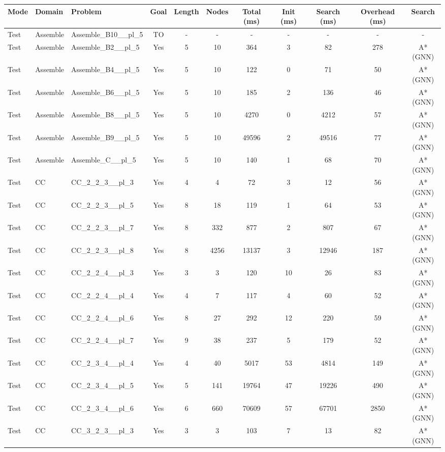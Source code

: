 \documentclass{article}
\begin{document}
\begin{tabular}{lllcccccccc}
\toprule
Mode & Domain & Problem & Goal & Length & Nodes & Total (ms) & Init (ms) & Search (ms) & Overhead (ms) & Search \\
\midrule
Test & Assemble & Assemble\_B10\_\_pl\_5 & TO & - & - & - & - & - & - & - \\
Test & Assemble & Assemble\_B2\_\_pl\_5 & Yes & 5 & 10 & 364 & 3 & 82 & 278 & A*(GNN) \\
Test & Assemble & Assemble\_B4\_\_pl\_5 & Yes & 5 & 10 & 122 & 0 & 71 & 50 & A*(GNN) \\
Test & Assemble & Assemble\_B6\_\_pl\_5 & Yes & 5 & 10 & 185 & 2 & 136 & 46 & A*(GNN) \\
Test & Assemble & Assemble\_B8\_\_pl\_5 & Yes & 5 & 10 & 4270 & 0 & 4212 & 57 & A*(GNN) \\
Test & Assemble & Assemble\_B9\_\_pl\_5 & Yes & 5 & 10 & 49596 & 2 & 49516 & 77 & A*(GNN) \\
Test & Assemble & Assemble\_C\_\_pl\_5 & Yes & 5 & 10 & 140 & 1 & 68 & 70 & A*(GNN) \\
Test & CC & CC\_2\_2\_3\_\_pl\_3 & Yes & 4 & 4 & 72 & 3 & 12 & 56 & A*(GNN) \\
Test & CC & CC\_2\_2\_3\_\_pl\_5 & Yes & 8 & 18 & 119 & 1 & 64 & 53 & A*(GNN) \\
Test & CC & CC\_2\_2\_3\_\_pl\_7 & Yes & 8 & 332 & 877 & 2 & 807 & 67 & A*(GNN) \\
Test & CC & CC\_2\_2\_3\_\_pl\_8 & Yes & 8 & 4256 & 13137 & 3 & 12946 & 187 & A*(GNN) \\
Test & CC & CC\_2\_2\_4\_\_pl\_3 & Yes & 3 & 3 & 120 & 10 & 26 & 83 & A*(GNN) \\
Test & CC & CC\_2\_2\_4\_\_pl\_4 & Yes & 4 & 7 & 117 & 4 & 60 & 52 & A*(GNN) \\
Test & CC & CC\_2\_2\_4\_\_pl\_6 & Yes & 8 & 27 & 292 & 12 & 220 & 59 & A*(GNN) \\
Test & CC & CC\_2\_2\_4\_\_pl\_7 & Yes & 9 & 38 & 237 & 5 & 179 & 52 & A*(GNN) \\
Test & CC & CC\_2\_3\_4\_\_pl\_4 & Yes & 4 & 40 & 5017 & 53 & 4814 & 149 & A*(GNN) \\
Test & CC & CC\_2\_3\_4\_\_pl\_5 & Yes & 5 & 141 & 19764 & 47 & 19226 & 490 & A*(GNN) \\
Test & CC & CC\_2\_3\_4\_\_pl\_6 & Yes & 6 & 660 & 70609 & 57 & 67701 & 2850 & A*(GNN) \\
Test & CC & CC\_3\_2\_3\_\_pl\_3 & Yes & 3 & 3 & 103 & 7 & 13 & 82 & A*(GNN) \\

\end{tabular}
\end{document}

